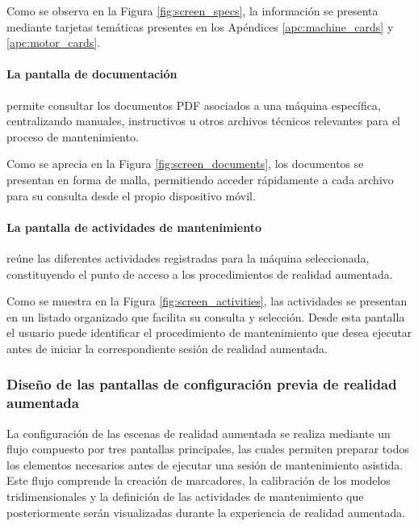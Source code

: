                 Como se observa en la Figura \ref{fig:screen_specs}, la información se presenta mediante tarjetas temáticas presentes en los Apéndices \ref{apc:machine_cards} y \ref{apc:motor_cards}.

            \paragraph{La pantalla de documentación}

                permite consultar los documentos PDF asociados a una máquina específica, centralizando manuales, instructivos u otros archivos técnicos relevantes para el proceso de mantenimiento.

                

                Como se aprecia en la Figura \ref{fig:screen_documents}, los documentos se presentan en forma de malla, permitiendo acceder rápidamente a cada archivo para su consulta desde el propio dispositivo móvil.

            \paragraph{La pantalla de actividades de mantenimiento}

                reúne las diferentes actividades registradas para la máquina seleccionada, constituyendo el punto de acceso a los procedimientos de realidad aumentada.

                

                Como se muestra en la Figura \ref{fig:screen_activities}, las actividades se presentan en un listado organizado que facilita su consulta y selección. Desde esta pantalla el usuario puede identificar el procedimiento de mantenimiento que desea ejecutar antes de iniciar la correspondiente sesión de realidad aumentada.

        \subsubsection{Diseño de las pantallas de configuración previa de realidad aumentada}

            La configuración de las escenas de realidad aumentada se realiza mediante un flujo compuesto por tres pantallas principales, las cuales permiten preparar todos los elementos necesarios antes de ejecutar una sesión de mantenimiento asistida. Este flujo comprende la creación de marcadores, la calibración de los modelos tridimensionales y la definición de las actividades de mantenimiento que posteriormente serán visualizadas durante la experiencia de realidad aumentada.

